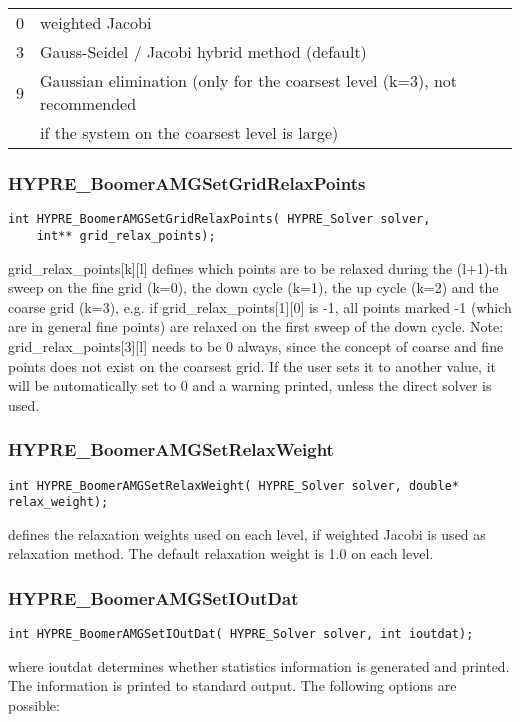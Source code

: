 \begin{tabular}{l l}
 0 & weighted Jacobi \\
 3 & Gauss-Seidel / Jacobi hybrid method (default) \\
 9 & Gaussian elimination (only for the coarsest level (k=3), not recommended\\ 
 & if the system on the coarsest level is large)\\
\end{tabular}

\subsubsection*{HYPRE\_BoomerAMGSetGridRelaxPoints}
\begin{display}
\begin{verbatim}
int HYPRE_BoomerAMGSetGridRelaxPoints( HYPRE_Solver solver, 
	int** grid_relax_points);
\end{verbatim}
\end{display}
grid\_relax\_points[k][l] defines which points are to be relaxed during
the (l+1)-th sweep on the fine 
grid (k=0), the down cycle (k=1), the up cycle (k=2) and the coarse grid (k=3),
e.g. if grid\_relax\_points[1][0] is -1, all points marked -1 (which are in
general fine points) are relaxed on the first sweep of the down cycle.
Note: grid\_relax\_points[3][l] needs to be 0 always, since the concept of 
coarse and fine points does not exist on the coarsest grid. If the user
sets it to another value, it will be automatically set to 0 and a warning
printed, unless the direct solver is used.

\subsubsection*{HYPRE\_BoomerAMGSetRelaxWeight}
\begin{display}
\begin{verbatim}
int HYPRE_BoomerAMGSetRelaxWeight( HYPRE_Solver solver, double* relax_weight);
\end{verbatim}
\end{display}
defines the relaxation weights used on each level, if weighted Jacobi is used
as relaxation method. The default relaxation weight is 1.0 on each level.

\subsubsection*{HYPRE\_BoomerAMGSetIOutDat}
\begin{display}
\begin{verbatim}
int HYPRE_BoomerAMGSetIOutDat( HYPRE_Solver solver, int ioutdat);
\end{verbatim}
\end{display}
where ioutdat determines whether statistics information is generated and 
printed. The information is printed to standard output.
The following options are possible:

